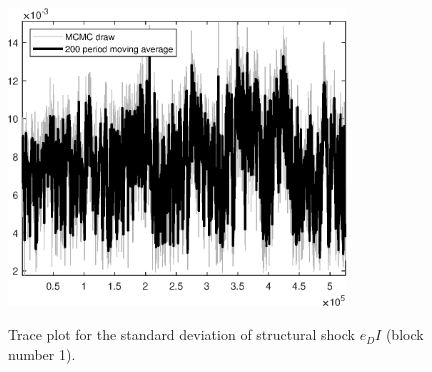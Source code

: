 \begin{figure}[H]
\centering
  \includegraphics[width=0.8\textwidth]{BRS_growth_KPR/graphs/TracePlot_SE_e_DI_blck_1}\\
    \caption{Trace plot for the standard deviation of structural shock ${e_DI}$ (block number 1).}
\end{figure}
